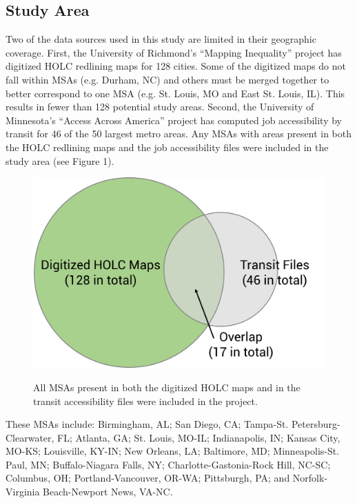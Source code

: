 \documentclass[paper=letter, fontsize=12pt]{scrartcl} %
\begin{document}
\subsection{Study Area}
Two of the data sources used in this study are limited in their geographic coverage. First, the University of Richmond's ``Mapping Inequality'' project has digitized HOLC redlining maps for 128 cities. Some of the digitized maps do not fall within MSAs (e.g. Durham, NC) and others must be merged together to better correspond to one MSA (e.g. St. Louis, MO and East St. Louis, IL). This results in fewer than 128 potential study areas. Second, the University of Minnesota's ``Access Across America'' project has computed job accessibility by transit for 46 of the 50 largest metro areas. Any MSAs with areas present in both the HOLC redlining maps and the job accessibility files were included in the study area (see Figure 1).\par
\begin{figure}[h]
	\centering
	\includegraphics[width = 4.5in]{StudyAreaSelection}\\
	\caption{All MSAs present in both the digitized HOLC maps and in the transit accessibility files were included in the project.}
\end{figure}
These MSAs include: Birmingham, AL; San Diego, CA; Tampa-St. Petersburg-Clearwater, FL; Atlanta, GA; St. Louis, MO-IL; Indianapolis, IN; Kansas City, MO-KS; Louisville, KY-IN; New Orleans, LA; Baltimore, MD; Minneapolis-St. Paul, MN; Buffalo-Niagara Falls, NY; Charlotte-Gastonia-Rock Hill, NC-SC; Columbus, OH; Portland-Vancouver, OR-WA; Pittsburgh, PA; and Norfolk-Virginia Beach-Newport News, VA-NC.
\end{document}
